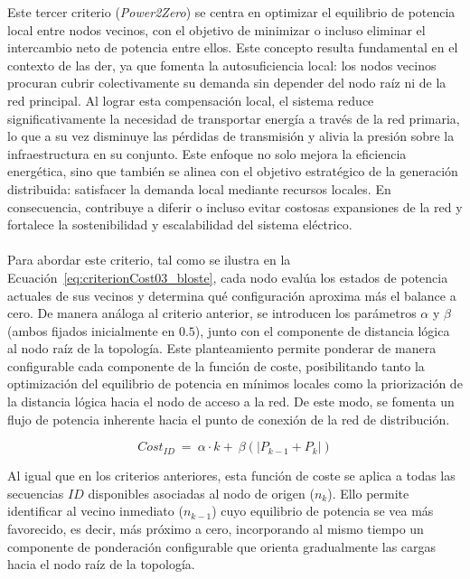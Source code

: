 Este tercer criterio (\textit{Power2Zero}) se centra en optimizar el equilibrio de potencia local entre nodos vecinos, con el objetivo de minimizar o incluso eliminar el intercambio neto de potencia entre ellos. Este concepto resulta fundamental en el contexto de las \gls{der}, ya que fomenta la autosuficiencia local: los nodos vecinos procuran cubrir colectivamente su demanda sin depender del nodo raíz ni de la red principal. Al lograr esta compensación local, el sistema reduce significativamente la necesidad de transportar energía a través de la red primaria, lo que a su vez disminuye las pérdidas de transmisión y alivia la presión sobre la infraestructura en su conjunto. Este enfoque no solo mejora la eficiencia energética, sino que también se alinea con el objetivo estratégico de la generación distribuida: satisfacer la demanda local mediante recursos locales. En consecuencia, contribuye a diferir o incluso evitar costosas expansiones de la red y fortalece la sostenibilidad y escalabilidad del sistema eléctrico.\\
\\
Para abordar este criterio, tal como se ilustra en la Ecuación~\ref{eq:criterionCost03_bloste}, cada nodo evalúa los estados de potencia actuales de sus vecinos y determina qué configuración aproxima más el balance a cero. De manera análoga al criterio anterior, se introducen los parámetros $\alpha$ y $\beta$ (ambos fijados inicialmente en $0.5$), junto con el componente de distancia lógica al nodo raíz de la topología. Este planteamiento permite ponderar de manera configurable cada componente de la función de coste, posibilitando tanto la optimización del equilibrio de potencia en mínimos locales como la priorización de la distancia lógica hacia el nodo de acceso a la red. De este modo, se fomenta un flujo de potencia inherente hacia el punto de conexión de la red de distribución.  

\begin{equation}\label{eq:criterionCost03_bloste}
       Cost_{ID}  \: = \: \alpha \cdot k + \: \beta (|P_{k-1} + P_{k}|) 
\end{equation}


Al igual que en los criterios anteriores, esta función de coste se aplica a todas las secuencias $ID$ disponibles asociadas al nodo de origen ($n_{k}$). Ello permite identificar al vecino inmediato ($n_{k-1}$) cuyo equilibrio de potencia se vea más favorecido, es decir, más próximo a cero, incorporando al mismo tiempo un componente de ponderación configurable que orienta gradualmente las cargas hacia el nodo raíz de la topología.

